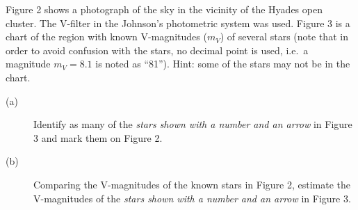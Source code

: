 Figure 2 shows a photograph of the sky in the vicinity of the Hyades open
cluster. The V-filter in the Johnson's photometric system was used. Figure 3
is a chart of the region with known V-magnitudes ($m_V$) of several stars
(note that in order to avoid confusion with the stars, no decimal point is
used, i.e.\ a magnitude $m_V = 8.1$ is noted as ``81''). Hint: some of the
stars may not be in the chart.

\begin{description}
\item[(a)] Identify as many of the \emph{stars shown with a number and an
  arrow} in Figure 3 and mark them on Figure 2.
\item[(b)] Comparing the V-magnitudes of the known stars in Figure 2, estimate
  the V-magnitudes of the \emph{stars shown with a number and an arrow} in
  Figure 3.
\end{description}


